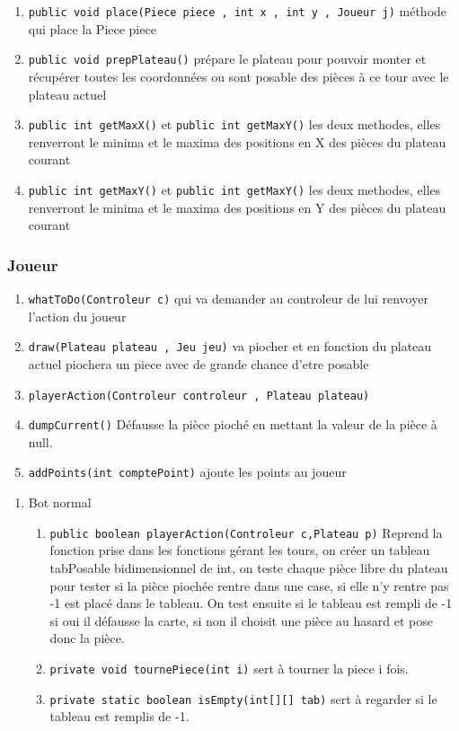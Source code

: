 \documentclass[11pt]{article}
\begin{document}
\begin{enumerate}
\begin{enumerate}
\item \texttt{public void place(Piece piece , int x , int y , Joueur j)} méthode qui place la Piece piece
\item \texttt{public void prepPlateau()} prépare le plateau pour pouvoir monter et récupérer toutes les coordonnées ou sont posable des pièces à ce tour avec le plateau actuel
\item \texttt{public int getMaxX()} et \texttt{public int getMaxY()} les deux methodes, elles renverront le minima et le maxima des positions en X des pièces du plateau courant
\item \texttt{public int getMaxY()} et \texttt{public int getMaxY()} les deux methodes, elles renverront le minima et le maxima des positions en Y des pièces du plateau courant
\end{enumerate}
\end{enumerate}

\subsubsection{Joueur}
\label{sec:org3a97a68}
\begin{enumerate}
\item \texttt{whatToDo(Controleur c)} qui va demander au controleur de lui renvoyer l'action du joueur
\item \texttt{draw(Plateau plateau , Jeu jeu)} va piocher et en fonction du plateau actuel piochera un piece avec de grande chance d'etre posable
\item \texttt{playerAction(Controleur controleur , Plateau plateau)}
\item \texttt{dumpCurrent()} Défausse la pièce pioché en mettant la valeur de la pièce à null.
\item \texttt{addPoints(int comptePoint)} ajoute les points au joueur
\end{enumerate}
\begin{enumerate}
\item Bot normal
\label{sec:org1c36f65}
\begin{enumerate}
\item \texttt{public boolean playerAction(Controleur c,Plateau p)} Reprend la fonction prise dans les fonctions gérant les tours, on créer un tableau tabPosable bidimensionnel de int, on teste chaque pièce libre du plateau pour tester si la pièce piochée rentre dans une case, si elle n'y rentre pas -1 est placé dans le tableau. On test ensuite si le tableau est rempli de -1 si oui il défausse la carte, si non il choisit une pièce au hasard et pose donc la pièce.
\item \texttt{private void tournePiece(int i)} sert à tourner la piece i fois.
\item \texttt{private static boolean isEmpty(int[][] tab)} sert à regarder si le tableau est remplis de -1.
\end{enumerate}
\end{enumerate}
\end{document}
